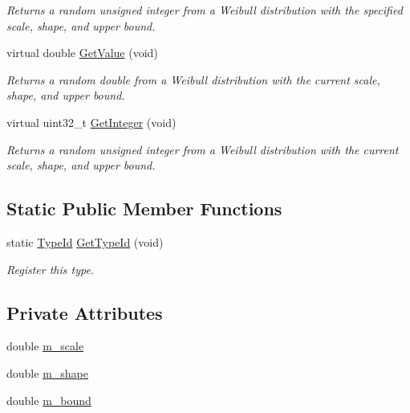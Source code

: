 \begin{DoxyCompactItemize}
\begin{DoxyCompactList}\small\item\em Returns a random unsigned integer from a Weibull distribution with the specified scale, shape, and upper bound. \end{DoxyCompactList}\item 
virtual double \hyperlink{classns3_1_1WeibullRandomVariable_a2575524b816f29677d0ad6e0a57a3833}{Get\+Value} (void)
\begin{DoxyCompactList}\small\item\em Returns a random double from a Weibull distribution with the current scale, shape, and upper bound. \end{DoxyCompactList}\item 
virtual uint32\+\_\+t \hyperlink{classns3_1_1WeibullRandomVariable_a44967586ae8623eba6a0855f93abb1f2}{Get\+Integer} (void)
\begin{DoxyCompactList}\small\item\em Returns a random unsigned integer from a Weibull distribution with the current scale, shape, and upper bound. \end{DoxyCompactList}\end{DoxyCompactItemize}
\subsection*{Static Public Member Functions}
\begin{DoxyCompactItemize}
\item 
static \hyperlink{classns3_1_1TypeId}{Type\+Id} \hyperlink{classns3_1_1WeibullRandomVariable_aab32ae576b15af76429351cfedf590a5}{Get\+Type\+Id} (void)
\begin{DoxyCompactList}\small\item\em Register this type. \end{DoxyCompactList}\end{DoxyCompactItemize}
\subsection*{Private Attributes}
\begin{DoxyCompactItemize}
\item 
double \hyperlink{classns3_1_1WeibullRandomVariable_a6129dc5c27fb0bce38643c21e3fbac1f}{m\+\_\+scale}
\item 
double \hyperlink{classns3_1_1WeibullRandomVariable_a2bdace237fb231000449198efd0f9c01}{m\+\_\+shape}
\item 
double \hyperlink{classns3_1_1WeibullRandomVariable_a5ddde1ec27e5c9c3091d5474af911cbb}{m\+\_\+bound}
\end{DoxyCompactItemize}
